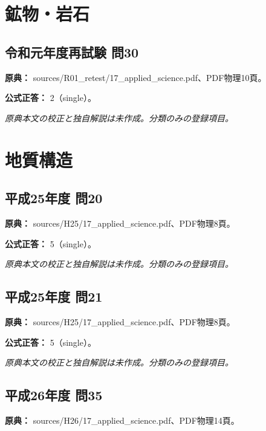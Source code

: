 \section{鉱物・岩石}

\subsection{令和元年度再試験 問30}
\label{q:r01-ret-applied-30}

\noindent\textbf{原典：} sources/R01\_retest/17\_applied\_science.pdf、PDF物理10頁。

\textbf{公式正答：} 2（single）。

\par\textit{原典本文の校正と独自解説は未作成。分類のみの登録項目。}

\section{地質構造}

\subsection{平成25年度 問20}
\label{q:h25-reg-applied-20}

\noindent\textbf{原典：} sources/H25/17\_applied\_science.pdf、PDF物理8頁。

\textbf{公式正答：} 5（single）。

\par\textit{原典本文の校正と独自解説は未作成。分類のみの登録項目。}

\subsection{平成25年度 問21}
\label{q:h25-reg-applied-21}

\noindent\textbf{原典：} sources/H25/17\_applied\_science.pdf、PDF物理8頁。

\textbf{公式正答：} 5（single）。

\par\textit{原典本文の校正と独自解説は未作成。分類のみの登録項目。}

\subsection{平成26年度 問35}
\label{q:h26-reg-applied-35}

\noindent\textbf{原典：} sources/H26/17\_applied\_science.pdf、PDF物理14頁。


